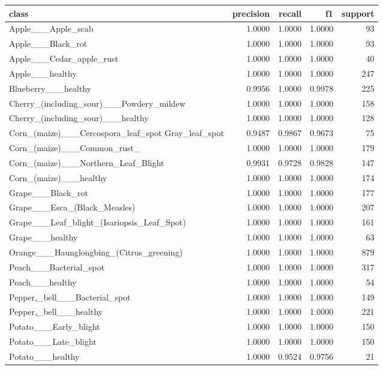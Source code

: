 \begin{tabular}{lrrrr}
\toprule
class & precision & recall & f1 & support \\
\midrule
Apple\_\_\_Apple\_scab & 1.0000 & 1.0000 & 1.0000 & 93 \\
Apple\_\_\_Black\_rot & 1.0000 & 1.0000 & 1.0000 & 93 \\
Apple\_\_\_Cedar\_apple\_rust & 1.0000 & 1.0000 & 1.0000 & 40 \\
Apple\_\_\_healthy & 1.0000 & 1.0000 & 1.0000 & 247 \\
Blueberry\_\_\_healthy & 0.9956 & 1.0000 & 0.9978 & 225 \\
Cherry\_(including\_sour)\_\_\_Powdery\_mildew & 1.0000 & 1.0000 & 1.0000 & 158 \\
Cherry\_(including\_sour)\_\_\_healthy & 1.0000 & 1.0000 & 1.0000 & 128 \\
Corn\_(maize)\_\_\_Cercospora\_leaf\_spot Gray\_leaf\_spot & 0.9487 & 0.9867 & 0.9673 & 75 \\
Corn\_(maize)\_\_\_Common\_rust\_ & 1.0000 & 1.0000 & 1.0000 & 179 \\
Corn\_(maize)\_\_\_Northern\_Leaf\_Blight & 0.9931 & 0.9728 & 0.9828 & 147 \\
Corn\_(maize)\_\_\_healthy & 1.0000 & 1.0000 & 1.0000 & 174 \\
Grape\_\_\_Black\_rot & 1.0000 & 1.0000 & 1.0000 & 177 \\
Grape\_\_\_Esca\_(Black\_Measles) & 1.0000 & 1.0000 & 1.0000 & 207 \\
Grape\_\_\_Leaf\_blight\_(Isariopsis\_Leaf\_Spot) & 1.0000 & 1.0000 & 1.0000 & 161 \\
Grape\_\_\_healthy & 1.0000 & 1.0000 & 1.0000 & 63 \\
Orange\_\_\_Haunglongbing\_(Citrus\_greening) & 1.0000 & 1.0000 & 1.0000 & 879 \\
Peach\_\_\_Bacterial\_spot & 1.0000 & 1.0000 & 1.0000 & 317 \\
Peach\_\_\_healthy & 1.0000 & 1.0000 & 1.0000 & 54 \\
Pepper,\_bell\_\_\_Bacterial\_spot & 1.0000 & 1.0000 & 1.0000 & 149 \\
Pepper,\_bell\_\_\_healthy & 1.0000 & 1.0000 & 1.0000 & 221 \\
Potato\_\_\_Early\_blight & 1.0000 & 1.0000 & 1.0000 & 150 \\
Potato\_\_\_Late\_blight & 1.0000 & 1.0000 & 1.0000 & 150 \\
Potato\_\_\_healthy & 1.0000 & 0.9524 & 0.9756 & 21 \\

\end{tabular}
